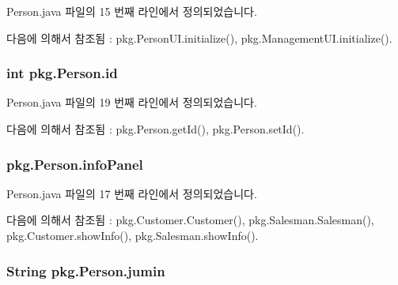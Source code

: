 Person.\+java 파일의 15 번째 라인에서 정의되었습니다.



다음에 의해서 참조됨 \+:  pkg.\+Person\+U\+I.\+initialize(), pkg.\+Management\+U\+I.\+initialize().

\subsubsection[{\texorpdfstring{id}{id}}]{\setlength{\rightskip}{0pt plus 5cm}int pkg.\+Person.\+id\hspace{0.3cm}{\ttfamily [protected]}}\hypertarget{classpkg_1_1_person_acd3bca96258af32adc1eca89b74222a6}{}\label{classpkg_1_1_person_acd3bca96258af32adc1eca89b74222a6}


Person.\+java 파일의 19 번째 라인에서 정의되었습니다.



다음에 의해서 참조됨 \+:  pkg.\+Person.\+get\+Id(), pkg.\+Person.\+set\+Id().

\subsubsection[{\texorpdfstring{info\+Panel}{infoPanel}}]{ pkg.\+Person.\+info\+Panel\hspace{0.3cm}{\ttfamily [protected]}}\hypertarget{classpkg_1_1_person_a4a1890f00be07d1bc4e3e9df16425210}{}\label{classpkg_1_1_person_a4a1890f00be07d1bc4e3e9df16425210}


Person.\+java 파일의 17 번째 라인에서 정의되었습니다.



다음에 의해서 참조됨 \+:  pkg.\+Customer.\+Customer(), pkg.\+Salesman.\+Salesman(), pkg.\+Customer.\+show\+Info(), pkg.\+Salesman.\+show\+Info().

\subsubsection[{\texorpdfstring{jumin}{jumin}}]{\setlength{\rightskip}{0pt plus 5cm}String pkg.\+Person.\+jumin\hspace{0.3cm}{\ttfamily [protected]}}\hypertarget{classpkg_1_1_person_aef72766ac67a0af8074b513d00c523f8}{}\label{classpkg_1_1_person_aef72766ac67a0af8074b513d00c523f8}


